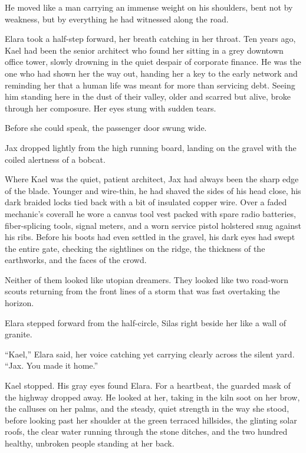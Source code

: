 He moved like a man carrying an immense weight on his shoulders, bent not by weakness, but by everything he had witnessed along the road.

Elara took a half-step forward, her breath catching in her throat. Ten years ago, Kael had been the senior architect who found her sitting in a grey downtown office tower, slowly drowning in the quiet despair of corporate finance. He was the one who had shown her the way out, handing her a key to the early network and reminding her that a human life was meant for more than servicing debt. Seeing him standing here in the dust of their valley, older and scarred but alive, broke through her composure. Her eyes stung with sudden tears.

Before she could speak, the passenger door swung wide.

Jax dropped lightly from the high running board, landing on the gravel with the coiled alertness of a bobcat. 

Where Kael was the quiet, patient architect, Jax had always been the sharp edge of the blade. Younger and wire-thin, he had shaved the sides of his head close, his dark braided locks tied back with a bit of insulated copper wire. Over a faded mechanic’s coverall he wore a canvas tool vest packed with spare radio batteries, fiber-splicing tools, signal meters, and a worn service pistol holstered snug against his ribs. Before his boots had even settled in the gravel, his dark eyes had swept the entire gate, checking the sightlines on the ridge, the thickness of the earthworks, and the faces of the crowd.

Neither of them looked like utopian dreamers. They looked like two road-worn scouts returning from the front lines of a storm that was fast overtaking the horizon.

Elara stepped forward from the half-circle, Silas right beside her like a wall of granite.

``Kael,'' Elara said, her voice catching yet carrying clearly across the silent yard. ``Jax. You made it home.''

Kael stopped. His gray eyes found Elara. For a heartbeat, the guarded mask of the highway dropped away. He looked at her, taking in the kiln soot on her brow, the calluses on her palms, and the steady, quiet strength in the way she stood, before looking past her shoulder at the green terraced hillsides, the glinting solar roofs, the clear water running through the stone ditches, and the two hundred healthy, unbroken people standing at her back.

